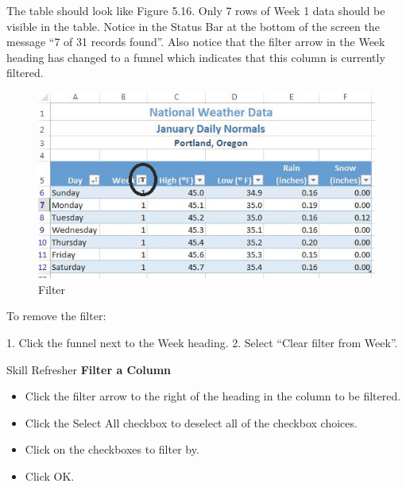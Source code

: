 The table should look like Figure 5.16. Only 7 rows of Week 1 data should be visible in the table. Notice in the Status Bar at the bottom of the screen the message ``7 of 31 records found''. Also notice that the filter arrow in the Week heading has changed to a funnel which indicates that this column is currently filtered.


\begin{figure}[H]
	\centering
	\includegraphics[width=\maxwidth{.95\linewidth}]{gfx/ch05_fig16}
	\caption{Filter}
	\label{05:fig16}
\end{figure}





To remove the filter:

1. Click the funnel next to the Week heading.
2. Select ``Clear filter from Week''.

\begin{center}
	\begin{sklbox}{Skill Refresher}
		\textbf{Filter a Column}
		\\
		\begin{itemize}
			\setlength{\itemsep}{0pt}
			\setlength{\parskip}{0pt}
			\setlength{\parsep}{0pt}

			\item Click the filter arrow to the right of the heading in the column to be filtered.
			\item Click the Select All checkbox to deselect all of the checkbox choices.
			\item Click on the checkboxes to filter by.
			\item Click OK.
			
		\end{itemize}
	\end{sklbox}
\end{center}



